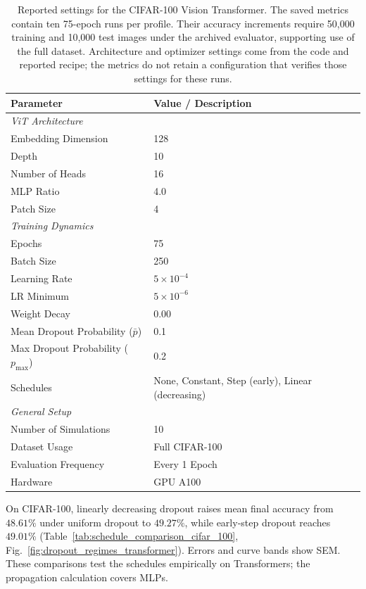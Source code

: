 \begin{table}[h]
 \caption{Reported settings for the CIFAR-100 Vision Transformer. The saved metrics contain ten 75-epoch runs per profile. Their accuracy increments require 50,000 training and 10,000 test images under the archived evaluator, supporting use of the full dataset. Architecture and optimizer settings come from the code and reported recipe; the metrics do not retain a configuration that verifies those settings for these runs.}
 \label{tab:vit_config}
 \centering
 \footnotesize
 \setlength{\tabcolsep}{3pt}
 \renewcommand{\arraystretch}{0.9}
 \begin{tabular}{l l}
 \toprule
 \textbf{Parameter} & \textbf{Value / Description} \\
 \midrule
 \multicolumn{2}{l}{\textit{ViT Architecture}} \\
 \midrule
 Embedding Dimension & 128 \\
 Depth & 10 \\
 Number of Heads & 16 \\
 MLP Ratio & 4.0 \\
 Patch Size & 4 \\
 \midrule
 \multicolumn{2}{l}{\textit{Training Dynamics}} \\
 \midrule
 Epochs & 75 \\
 Batch Size & 250 \\
 Learning Rate & $5 \times 10^{-4}$ \\
 LR Minimum & $5 \times 10^{-6}$ \\
 Weight Decay & 0.00 \\
 Mean Dropout Probability ($\bar{p}$) & 0.1 \\
 Max Dropout Probability ($p_{\max}$) & 0.2 \\
 Schedules & None, Constant, Step (early), Linear (decreasing) \\
 \midrule
 \multicolumn{2}{l}{\textit{General Setup}} \\
 \midrule
 Number of Simulations & 10 \\
 Dataset Usage & Full CIFAR-100 \\
 Evaluation Frequency & Every 1 Epoch \\
 Hardware & GPU A100 \\
 \bottomrule
 \end{tabular}
\end{table}

On CIFAR-100, linearly decreasing dropout raises mean final accuracy from $48.61\%$ under uniform dropout to $49.27\%$, while early-step dropout reaches $49.01\%$ (Table~\ref{tab:schedule_comparison_cifar_100}, Fig.~\ref{fig:dropout_regimes_transformer}). Errors and curve bands show SEM. These comparisons test the schedules empirically on Transformers; the propagation calculation covers MLPs.

